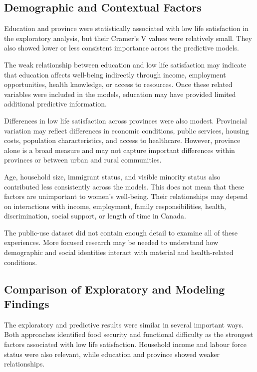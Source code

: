 \documentclass[12pt]{article}
\begin{document}
\subsection{Demographic and Contextual Factors}

Education and province were statistically associated with low life satisfaction in the exploratory analysis, but their Cramer's V values were relatively small. They also showed lower or less consistent importance across the predictive models.

The weak relationship between education and low life satisfaction may indicate that education affects well-being indirectly through income, employment opportunities, health knowledge, or access to resources. Once these related variables were included in the models, education may have provided limited additional predictive information.

Differences in low life satisfaction across provinces were also modest. Provincial variation may reflect differences in economic conditions, public services, housing costs, population characteristics, and access to healthcare. However, province alone is a broad measure and may not capture important differences within provinces or between urban and rural communities.

Age, household size, immigrant status, and visible minority status also contributed less consistently across the models. This does not mean that these factors are unimportant to women's well-being. Their relationships may depend on interactions with income, employment, family responsibilities, health, discrimination, social support, or length of time in Canada.

The public-use dataset did not contain enough detail to examine all of these experiences. More focused research may be needed to understand how demographic and social identities interact with material and health-related conditions.

\subsection{Comparison of Exploratory and Modeling Findings}

The exploratory and predictive results were similar in several important ways. Both approaches identified food security and functional difficulty as the strongest factors associated with low life satisfaction. Household income and labour force status were also relevant, while education and province showed weaker relationships.
\end{document}
